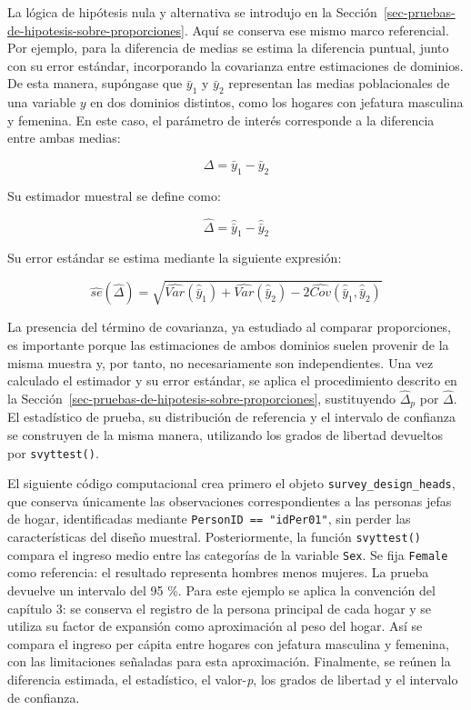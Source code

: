 \documentclass[
  spanish,
  11pt,
  letterpaper,
  oneside,
  open=any]{scrbook}
\begin{document}
La lógica de hipótesis nula y alternativa se introdujo en la
Sección~\ref{sec-pruebas-de-hipotesis-sobre-proporciones}. Aquí se
conserva ese mismo marco referencial. Por ejemplo, para la diferencia de
medias se estima la diferencia puntual, junto con su error estándar,
incorporando la covarianza entre estimaciones de dominios. De esta
manera, supóngase que \(\bar{y}_1\) y \(\bar{y}_2\) representan las
medias poblacionales de una variable \(y\) en dos dominios distintos,
como los hogares con jefatura masculina y femenina. En este caso, el
parámetro de interés corresponde a la diferencia entre ambas medias:

\[
\Delta = \bar{y}_1 - \bar{y}_2
\]

Su estimador muestral se define como:

\[
\hat{\Delta} = \hat{\bar{y}}_1 - \hat{\bar{y}}_2
\]

Su error estándar se estima mediante la siguiente expresión:

\[
\widehat{se}(\hat{\Delta}) =
\sqrt{
\widehat{Var}(\hat{\bar{y}}_1)
+
\widehat{Var}(\hat{\bar{y}}_2)
-
2\widehat{Cov}(\hat{\bar{y}}_1, \hat{\bar{y}}_2)
}
\]

La presencia del término de covarianza, ya estudiado al comparar
proporciones, es importante porque las estimaciones de ambos dominios
suelen provenir de la misma muestra y, por tanto, no necesariamente son
independientes. Una vez calculado el estimador y su error estándar, se
aplica el procedimiento descrito en la
Sección~\ref{sec-pruebas-de-hipotesis-sobre-proporciones}, sustituyendo
\(\hat{\Delta}_p\) por \(\hat{\Delta}\). El estadístico de prueba, su
distribución de referencia y el intervalo de confianza se construyen de
la misma manera, utilizando los grados de libertad devueltos por
\texttt{svyttest()}.

El siguiente código computacional crea primero el objeto
\texttt{survey\_design\_heads}, que conserva únicamente las
observaciones correspondientes a las personas jefas de hogar,
identificadas mediante \texttt{PersonID\ ==\ "idPer01"}, sin perder las
características del diseño muestral. Posteriormente, la función
\texttt{svyttest()} compara el ingreso medio entre las categorías de la
variable \texttt{Sex}. Se fija \texttt{Female} como referencia: el
resultado representa hombres menos mujeres. La prueba devuelve un
intervalo del 95 \%. Para este ejemplo se aplica la convención del
capítulo 3: se conserva el registro de la persona principal de cada
hogar y se utiliza su factor de expansión como aproximación al peso del
hogar. Así se compara el ingreso per cápita entre hogares con jefatura
masculina y femenina, con las limitaciones señaladas para esta
aproximación. Finalmente, se reúnen la diferencia estimada, el
estadístico, el valor-\emph{p}, los grados de libertad y el intervalo de
confianza.
\end{document}
